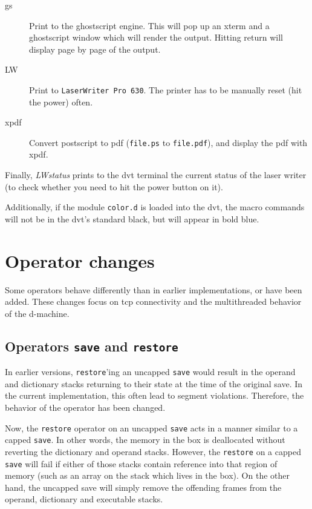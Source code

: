 \documentclass[12pt]{article}
\begin{document}
\begin{description}
\begin{description}
    \item[gs] Print to the ghostscript engine. This will pop up an
    xterm and a ghostscript window which will render the output.
    Hitting return will display page by page of the output.
    \item[LW] Print to \texttt{LaserWriter Pro 630}. The printer has
    to be manually reset (hit the power) often.
    \item[xpdf] Convert postscript to pdf (\texttt{file.ps} to
    \texttt{file.pdf}), and display the pdf with xpdf.
  \end{description}
  Finally, \emph{LWstatus} prints to the dvt terminal the current
  status of the laser writer (to check whether you need to hit the
  power button on it).
\end{description}

Additionally, if the module \texttt{color.d} is loaded into the dvt,
the macro commands will not be in the dvt's standard black, but will
appear in bold blue.

\section{Operator changes}

Some operators behave differently than in earlier implementations, or
have been added. These changes focus on tcp connectivity and the
multithreaded behavior of the d-machine.

\subsection{Operators \texttt{save} and \texttt{restore}}
\label{sec:save}

In earlier versions, \verb$restore$'ing an uncapped \verb$save$ would
result in the operand and dictionary stacks returning to their state
at the time of the original save. In the current implementation, this
often lead to segment violations. Therefore, the behavior of the
operator has been changed.

Now, the \verb$restore$ operator on an uncapped \verb$save$ acts in a
manner similar to a capped \verb$save$. In other words, the memory in
the box is deallocated without reverting the dictionary and operand
stacks. However, the \verb$restore$ on a capped \verb$save$ will fail
if either of those stacks contain reference into that region of memory
(such as an array on the stack which lives in the box). On the other
hand, the uncapped save will simply remove the offending frames from
the operand, dictionary and executable stacks.
\end{document}
